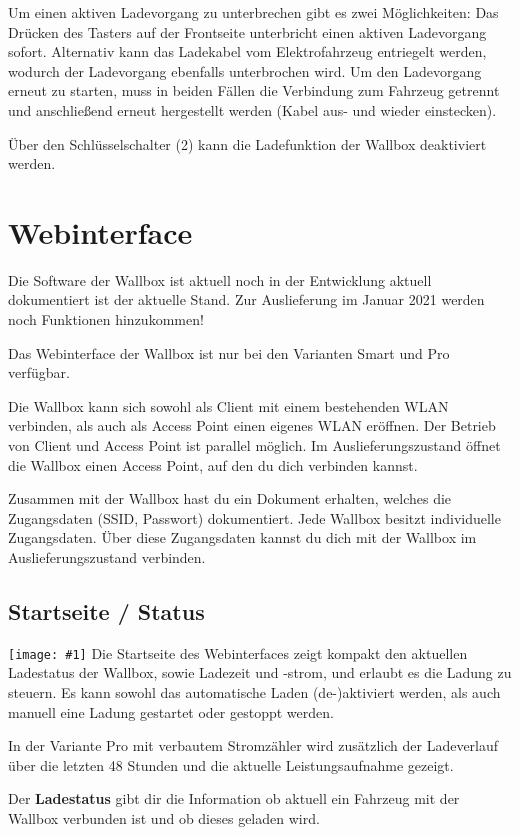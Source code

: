 \documentclass[a4paper,10pt]{article}
\newcommand{\hint}[1]{\begin{tcolorbox}[colback=boxgray,colframe=black,coltext=
white,title=Hinweis]#1\end{tcolorbox}}
\newcommand{\gfx}[1]{\texttt{[image: \#1]}}
\begin{document}
\begin{multicols*}{2}
	Um einen aktiven Ladevorgang zu unterbrechen gibt es zwei Möglichkeiten: Das
	Drücken des Tasters auf der Frontseite unterbricht einen aktiven Ladevorgang
	sofort. Alternativ kann das Ladekabel vom Elektrofahrzeug entriegelt werden,
	wodurch der Ladevorgang ebenfalls unterbrochen wird. Um den Ladevorgang erneut
	zu starten, muss in beiden Fällen die Verbindung zum Fahrzeug getrennt und
	anschließend erneut hergestellt werden (Kabel aus- und wieder einstecken).

	Über den Schlüsselschalter (2) kann die Ladefunktion der Wallbox deaktiviert
	werden.

	\section{Webinterface}
	\hint{Die Software der Wallbox ist aktuell noch in der Entwicklung aktuell
		dokumentiert ist der aktuelle Stand. Zur Auslieferung im Januar 2021 werden
		noch Funktionen hinzukommen!}
	Das Webinterface der Wallbox ist nur bei den Varianten Smart und Pro verfügbar.

	Die Wallbox kann sich sowohl als Client mit einem bestehenden WLAN verbinden,
	als auch als Access Point einen eigenes WLAN eröffnen. Der Betrieb von Client
	und Access Point ist parallel möglich. Im Auslieferungszustand öffnet die
	Wallbox einen Access Point, auf den du dich verbinden kannst.

	Zusammen mit der Wallbox hast du ein Dokument erhalten, welches die
	Zugangsdaten (SSID, Passwort) dokumentiert. Jede Wallbox besitzt individuelle
	Zugangsdaten.  Über diese Zugangsdaten kannst du dich mit der Wallbox im
	Auslieferungszustand verbinden.

	\subsection{Startseite / Status}
	\gfx{./img/resized/web_status}
	Die Startseite des Webinterfaces zeigt kompakt den aktuellen Ladestatus der 
	Wallbox, sowie Ladezeit und -strom, und erlaubt es die Ladung zu steuern. 
	Es kann sowohl das automatische Laden (de-)aktiviert werden, als auch 
	manuell eine Ladung gestartet oder gestoppt werden.

	In der Variante Pro mit verbautem Stromzähler wird zusätzlich der Ladeverlauf 
	über die letzten 48 Stunden und die aktuelle Leistungsaufnahme gezeigt.

	Der \textbf{Ladestatus} gibt dir die Information ob aktuell ein
	Fahrzeug mit der Wallbox verbunden ist und ob dieses geladen wird.


\end{multicols*}
\end{document}
